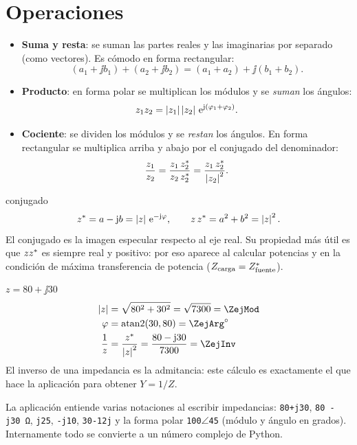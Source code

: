 \section{Operaciones}

\begin{itemize}
\item \textbf{Suma y resta}: se suman las partes reales y las imaginarias por separado (como vectores). Es cómodo en forma rectangular:
\begin{equation}
  (a_1 + \jj b_1) + (a_2 + \jj b_2) = (a_1 + a_2) + \jj(b_1 + b_2).
\end{equation}
\item \textbf{Producto}: en forma polar se multiplican los módulos y se \emph{suman} los ángulos:
\begin{equation}
  z_1 z_2 = \left|z_1\right|\left|z_2\right|\,\mathrm{e}^{\mathrm{j}(\varphi_1 + \varphi_2)} .
\end{equation}
\item \textbf{Cociente}: se dividen los módulos y se \emph{restan} los ángulos. En forma rectangular se multiplica arriba y abajo por el conjugado del denominador:
\begin{equation}
  \frac{z_1}{z_2} = \frac{z_1\,z_2^{*}}{z_2\,z_2^{*}} = \frac{z_1\,z_2^{*}}{\left|z_2\right|^2} .
\end{equation}
\end{itemize}

\begin{definicion}{conjugado}
\begin{equation}
  z^{*} = a - \mathrm{j} b = \left|z\right|\,\mathrm{e}^{-\mathrm{j}\varphi}, \qquad z\,z^{*} = a^2 + b^2 = \left|z\right|^2 .
\end{equation}
El conjugado es la imagen especular respecto al eje real. Su propiedad más útil es que $zz^{*}$ es siempre real y positivo:
por eso aparece al calcular potencias y en la condición de máxima transferencia de potencia ($Z_{\text{carga}} = Z_{\text{fuente}}^{*}$).
\end{definicion}

\begin{ejemplo}{$z = 80 + \jj 30$}
\begin{align*}
  \abs{z} &= \sqrt{80^2 + 30^2} = \sqrt{7300} = \ZejMod \\
  \varphi &= \operatorname{atan2}(30, 80) = \ZejArg^\circ \\
  \frac{1}{z} &= \frac{\conj z}{\abs{z}^2} = \frac{80 - \jj30}{7300} = \ZejInv
\end{align*}
El inverso de una impedancia es la admitancia: este cálculo es exactamente el que hace la aplicación para obtener $Y = 1/Z$.
\end{ejemplo}

\begin{enlaapp}
La aplicación entiende varias notaciones al escribir impedancias: \texttt{80+j30}, \texttt{80 - j30 Ω}, \texttt{j25}, \texttt{-j10},
\texttt{30-12j} y la forma polar \texttt{100}$\angle$\texttt{45} (módulo y ángulo en grados). Internamente todo se convierte a un número complejo de Python.
\end{enlaapp}
